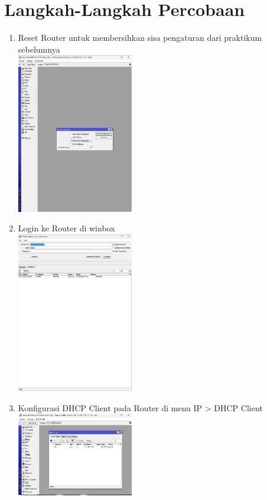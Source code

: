 \section{Langkah-Langkah Percobaan}
\begin{enumerate}
	\item Reset Router untuk membersihkan sisa pengaturan dari praktikum sebelumnya\\
	\includegraphics[width=0.4\textwidth]{p4/img/restart.jpg}
	\item Login ke Router di winbox \\
	\includegraphics[width=0.4\textwidth]{p4/img/login.jpg}
	\item Konfigurasi DHCP Client pada Router di menu IP > DHCP Client\\
	\includegraphics[width=0.4\textwidth]{p4/img/DHCP2.jpg}

\end{enumerate}
